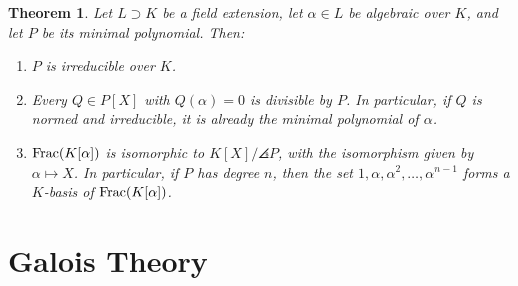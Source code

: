 \documentclass[10pt]{report}
\newtheorem{theorem}[lemma]{Theorem}
\theoremstyle{definition}
\begin{document}
	\begin{theorem}
		Let $L \supset K$ be a field extension, let $\alpha \in L$ be algebraic over $K$, and let $P$ be its minimal polynomial. Then:
		\begin{enumerate}
			\item $P$ is irreducible over $K$.
			\item Every $Q \in P[X]$ with $Q(\alpha) = 0$ is divisible by $P$. In particular, if $Q$ is normed and irreducible, it is already the minimal polynomial of $\alpha$.
			\item $\textnormal{Frac}(K[\alpha])$ is isomorphic to $K[X]/\angles{P}$, with the isomorphism given by $\alpha \mapsto X$. In particular, if $P$ has degree $n$, then the set $1, \alpha, \alpha^2, \hdots, \alpha^{n-1}$ forms a $K$-basis of $\textnormal{Frac}(K[\alpha])$.
		\end{enumerate}
	\end{theorem}
	\chapter{Galois Theory}
\end{document}
